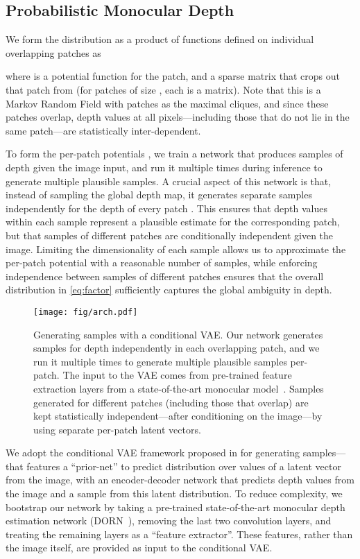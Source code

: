 \documentclass[10pt,twocolumn,letterpaper]{article}
\begin{document}
\subsection{Probabilistic Monocular Depth}

We form the distribution  as a product of functions defined on individual overlapping patches as

where  is a potential function for the  patch, and  a sparse matrix that crops out that patch from  (for patches of size , each  is a  matrix). Note that this is a Markov Random Field with  patches as the maximal cliques, and since these patches overlap, depth values at all pixels---including those that do not lie in the same patch---are statistically inter-dependent.

 To form the per-patch potentials , we train a network that produces samples of depth given the image input, and run it multiple times during inference to generate multiple plausible samples. A crucial aspect of this network is that, instead of  sampling the global depth map, it generates separate samples independently for the depth  of every patch . This ensures that depth values within each sample represent a plausible estimate for the corresponding patch, but that samples of different patches are conditionally independent given the image. Limiting the dimensionality of each sample allows us to approximate the per-patch potential  with a reasonable number of samples, while enforcing independence between samples of different patches ensures that the overall distribution  in \eqref{eq:factor} sufficiently captures the global ambiguity in depth.\begin{figure}[!t]
  \begin{center}
    \texttt{[image: fig/arch.pdf]}
  \end{center}
  \caption{Generating samples with a conditional VAE. Our network generates samples for depth independently in each overlapping patch, and we run it multiple times to generate multiple plausible samples per-patch. The input to the VAE comes from pre-trained feature extraction layers from a state-of-the-art monocular model~\cite{fu2018deep}. Samples generated for different patches (including those that overlap) are kept statistically independent---after conditioning on the image---by using separate per-patch latent vectors.}
  \label{fig:arch}
\end{figure}


We adopt the conditional VAE framework proposed in \cite{condVAE} for generating samples---that features a ``prior-net'' to predict distribution over values of a latent vector from the image, with an encoder-decoder network that predicts depth values from the image and a sample from this latent distribution. To reduce complexity, we bootstrap our network by taking a pre-trained state-of-the-art monocular depth estimation network (DORN~\cite{fu2018deep}), removing the last two convolution layers, and treating the remaining layers as a ``feature extractor''. These features, rather than the image itself, are provided as input to the conditional VAE.
\end{document}
